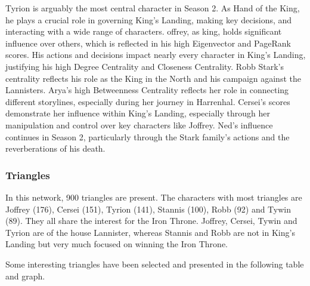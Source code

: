 \documentclass[10pt,twocolumn,letterpaper]{article}
\begin{document}
Tyrion is arguably the most central character in Season 2. As Hand of the King, he plays a crucial role in governing King's Landing, making key decisions, and interacting with a wide range of characters. offrey, as king, holds significant influence over others, which is reflected in his high Eigenvector and PageRank scores. His actions and decisions impact nearly every character in King’s Landing, justifying his high Degree Centrality and Closeness Centrality. Robb Stark’s centrality reflects his role as the King in the North and his campaign against the Lannisters. Arya's high Betweenness Centrality reflects her role in connecting different storylines, especially during her journey in Harrenhal. Cersei’s scores demonstrate her influence within King’s Landing, especially through her manipulation and control over key characters like Joffrey. Ned’s influence continues in Season 2, particularly through the Stark family’s actions and the reverberations of his death.

\subsubsection{Triangles}

In this network, 900 triangles are present. The characters with most triangles are Joffrey (176), Cersei (151), Tyrion (141), Stannis (100), Robb (92) and Tywin (89).
They all share the interest for the Iron Throne. Joffrey, Cersei, Tywin and Tyrion are of the house Lannister, whereas Stannis and Robb are not in King's Landing but very much focused on winning the Iron Throne.


Some interesting triangles have been selected and presented in the following table and graph.
\end{document}
